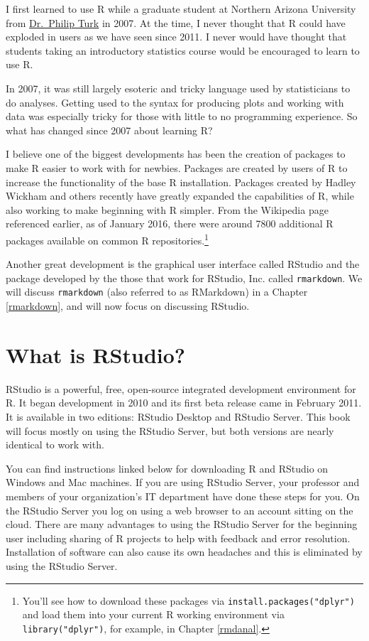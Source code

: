 \documentclass[]{tufte-book}
\begin{document}
I first learned to use R while a graduate student at Northern Arizona
University from \href{http://www.stat.colostate.edu/~pturk/}{Dr.~Philip
Turk} in 2007. At the time, I never thought that R could have exploded
in users as we have seen since 2011. I never would have thought that
students taking an introductory statistics course would be encouraged to
learn to use R.

In 2007, it was still largely esoteric and tricky language used by
statisticians to do analyses. Getting used to the syntax for producing
plots and working with data was especially tricky for those with little
to no programming experience. So what has changed since 2007 about
learning R?

I believe one of the biggest developments has been the creation of
packages to make R easier to work with for newbies. Packages are created
by users of R to increase the functionality of the base R installation.
Packages created by Hadley Wickham and others recently have greatly
expanded the capabilities of R, while also working to make beginning
with R simpler. From the Wikipedia page referenced earlier, as of
January 2016, there were around 7800 additional R packages available on
common R repositories.\footnote{You'll see how to download these
  packages via \texttt{install.packages("dplyr")} and load them into
  your current R working environment via \texttt{library("dplyr")}, for
  example, in Chapter \ref{rmdanal}.}

Another great development is the graphical user interface called RStudio
and the package developed by the those that work for RStudio, Inc.
called \texttt{rmarkdown}. We will discuss \texttt{rmarkdown} (also
referred to as RMarkdown) in a Chapter \ref{rmarkdown}, and will now
focus on discussing RStudio.

\section{What is RStudio?}\label{what-is-rstudio}

RStudio is a powerful, free, open-source integrated development
environment for R. It began development in 2010 and its first beta
release came in February 2011. It is available in two editions: RStudio
Desktop and RStudio Server. This book will focus mostly on using the
RStudio Server, but both versions are nearly identical to work with.

You can find instructions linked below for downloading R and RStudio on
Windows and Mac machines. If you are using RStudio Server, your
professor and members of your organization's IT department have done
these steps for you. On the RStudio Server you log on using a web
browser to an account sitting on the cloud. There are many advantages to
using the RStudio Server for the beginning user including sharing of R
projects to help with feedback and error resolution. Installation of
software can also cause its own headaches and this is eliminated by
using the RStudio Server.
\end{document}
